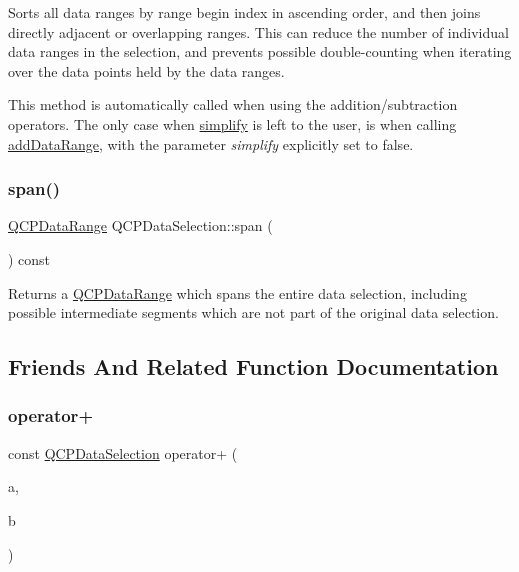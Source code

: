 Sorts all data ranges by range begin index in ascending order, and then joins directly adjacent or overlapping ranges. This can reduce the number of individual data ranges in the selection, and prevents possible double-\/counting when iterating over the data points held by the data ranges.

This method is automatically called when using the addition/subtraction operators. The only case when \mbox{\hyperlink{class_q_c_p_data_selection_a4a2fbad1a6e4d1dd26fdfdf88956f2a4}{simplify}} is left to the user, is when calling \mbox{\hyperlink{class_q_c_p_data_selection_a46740c5aa7b80ae9b2abf6985d61b74f}{add\+Data\+Range}}, with the parameter {\itshape simplify} explicitly set to false. \mbox{\label{class_q_c_p_data_selection_a890f9291e0b7f065747040de5d68ff7d}} 
\subsubsection{\texorpdfstring{span()}{span()}}
{\footnotesize\ttfamily \mbox{\hyperlink{class_q_c_p_data_range}{Q\+C\+P\+Data\+Range}} Q\+C\+P\+Data\+Selection\+::span (\begin{DoxyParamCaption}{ }\end{DoxyParamCaption}) const}

Returns a \mbox{\hyperlink{class_q_c_p_data_range}{Q\+C\+P\+Data\+Range}} which spans the entire data selection, including possible intermediate segments which are not part of the original data selection. 

\subsection{Friends And Related Function Documentation}
\mbox{\label{class_q_c_p_data_selection_a49c0217af248959d59abfdd29401b678}} 
\subsubsection{\texorpdfstring{operator+}{operator+}\hspace{0.1cm}{\footnotesize\ttfamily [1/4]}}
{\footnotesize\ttfamily const \mbox{\hyperlink{class_q_c_p_data_selection}{Q\+C\+P\+Data\+Selection}} operator+ (\begin{DoxyParamCaption}\item[{const \mbox{\hyperlink{class_q_c_p_data_selection}{Q\+C\+P\+Data\+Selection}} \&}]{a,  }\item[{const \mbox{\hyperlink{class_q_c_p_data_selection}{Q\+C\+P\+Data\+Selection}} \&}]{b }\end{DoxyParamCaption})\hspace{0.3cm}{\ttfamily [friend]}}

